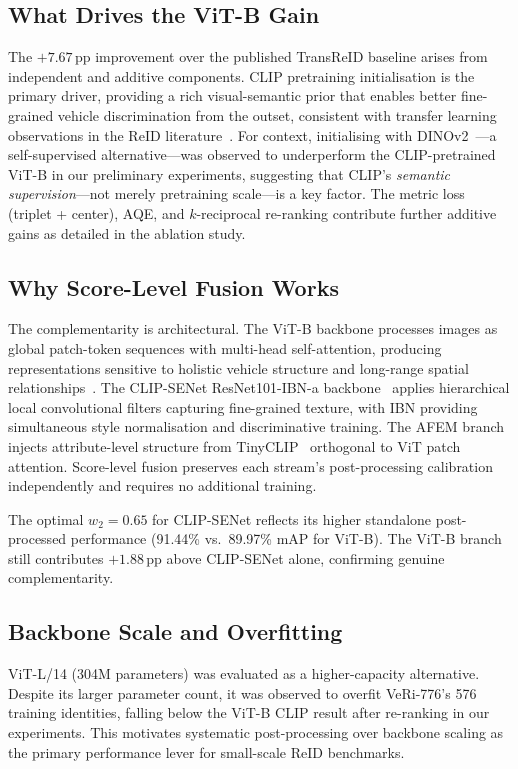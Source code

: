 \documentclass[11pt]{article}
\begin{document}
\subsection{What Drives the ViT-B Gain}
The $+7.67$\,pp improvement over the published TransReID baseline arises from
independent and additive components. CLIP pretraining initialisation is the
primary driver, providing a rich visual-semantic prior that enables better
fine-grained vehicle discrimination from the outset, consistent with transfer
learning observations in the ReID
literature~\cite{li2023clipreid,radford2021clip}. For context, initialising
with DINOv2~\cite{oquab2023dinov2}---a self-supervised alternative---was
observed to underperform the CLIP-pretrained ViT-B in our preliminary
experiments, suggesting that CLIP's \emph{semantic supervision}---not merely
pretraining scale---is a key factor. The metric loss (triplet + center),
AQE, and $k$-reciprocal re-ranking contribute further additive gains as
detailed in the ablation study.

\subsection{Why Score-Level Fusion Works}
The complementarity is architectural. The ViT-B backbone processes images as
global patch-token sequences with multi-head self-attention, producing
representations sensitive to holistic vehicle structure and long-range spatial
relationships~\cite{he2021transreid,dosovitskiy2021vit}. The CLIP-SENet
ResNet101-IBN-a backbone~\cite{pan2018ibn} applies hierarchical local
convolutional filters capturing fine-grained texture, with IBN providing
simultaneous style normalisation and discriminative training. The AFEM branch
injects attribute-level structure from TinyCLIP~\cite{lu2025clipsenet}
orthogonal to ViT patch attention. Score-level fusion preserves each stream's
post-processing calibration independently and requires no additional training.

The optimal $w_2{=}0.65$ for CLIP-SENet reflects its higher standalone
post-processed performance (91.44\% vs.\ 89.97\% mAP for ViT-B). The ViT-B
branch still contributes $+1.88$\,pp above CLIP-SENet alone, confirming
genuine complementarity.

\subsection{Backbone Scale and Overfitting}
ViT-L/14 (304M parameters) was evaluated as a higher-capacity alternative.
Despite its larger parameter count, it was observed to overfit VeRi-776's
576 training identities, falling below the ViT-B CLIP result after re-ranking
in our experiments. This motivates systematic post-processing over backbone
scaling as the primary performance lever for small-scale ReID benchmarks.
\end{document}
